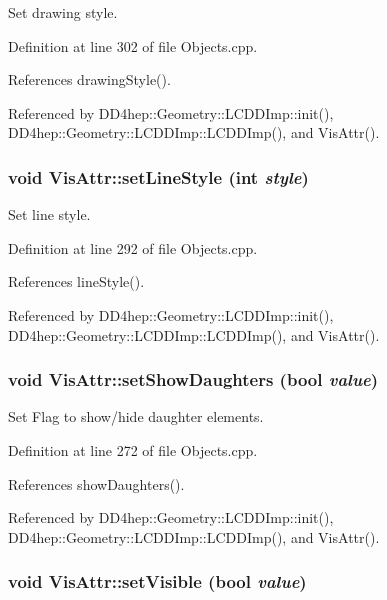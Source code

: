 Set drawing style. 

Definition at line 302 of file Objects.cpp.

References drawingStyle().

Referenced by DD4hep::Geometry::LCDDImp::init(), DD4hep::Geometry::LCDDImp::LCDDImp(), and VisAttr().\hypertarget{class_d_d4hep_1_1_geometry_1_1_vis_attr_ad86fa3158adc9cb58bdf7d72da8f1eee}{
\subsubsection[{setLineStyle}]{\setlength{\rightskip}{0pt plus 5cm}void VisAttr::setLineStyle (int {\em style})}}
\label{class_d_d4hep_1_1_geometry_1_1_vis_attr_ad86fa3158adc9cb58bdf7d72da8f1eee}


Set line style. 

Definition at line 292 of file Objects.cpp.

References lineStyle().

Referenced by DD4hep::Geometry::LCDDImp::init(), DD4hep::Geometry::LCDDImp::LCDDImp(), and VisAttr().\hypertarget{class_d_d4hep_1_1_geometry_1_1_vis_attr_af29f0854b9e6866b31830dd673f92df8}{
\subsubsection[{setShowDaughters}]{\setlength{\rightskip}{0pt plus 5cm}void VisAttr::setShowDaughters (bool {\em value})}}
\label{class_d_d4hep_1_1_geometry_1_1_vis_attr_af29f0854b9e6866b31830dd673f92df8}


Set Flag to show/hide daughter elements. 

Definition at line 272 of file Objects.cpp.

References showDaughters().

Referenced by DD4hep::Geometry::LCDDImp::init(), DD4hep::Geometry::LCDDImp::LCDDImp(), and VisAttr().\hypertarget{class_d_d4hep_1_1_geometry_1_1_vis_attr_a499e3e8252f4abd62be3a3be521f10b4}{
\subsubsection[{setVisible}]{\setlength{\rightskip}{0pt plus 5cm}void VisAttr::setVisible (bool {\em value})}}
\label{class_d_d4hep_1_1_geometry_1_1_vis_attr_a499e3e8252f4abd62be3a3be521f10b4}


